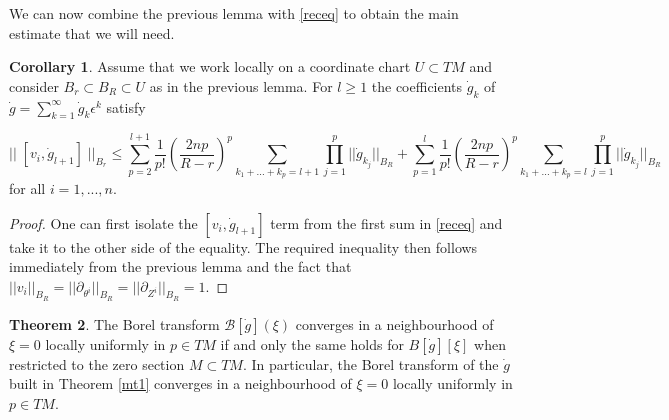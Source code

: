 \documentclass{article}
\theoremstyle{definition}
\newtheorem{theorem}{Theorem}[section]
\newtheorem{corollary}[theorem]{Corollary}
\numberwithin{equation}{section}
\begin{document}
We can now combine the previous lemma with \eqref{receq} to obtain the main estimate that we will need.
\begin{corollary}\label{keycol} Assume that we work locally on a coordinate chart $U\subset TM$ and consider $B_r\subset B_R\subset U$ as in the previous lemma. For $l\geq 1$ the coefficients $\dot{g}_{k}$ of $\dot{g}=\sum_{k=1}^{\infty}\dot{g}_k\epsilon^k$ satisfy

\begin{equation*}
    ||\;[v_i,\dot{g}_{l+1}]\;||_{B_r} \leq \sum_{p=2}^{l+1}\frac{1}{p!}\left(\frac{2np}{R-r}\right)^p\sum_{k_1+...+k_p=l+1}\prod_{j=1}^{p}||\dot{g}_{k_j}||_{B_R}+\sum_{p=1}^{l}\frac{1}{p!}\left(\frac{2np}{R-r}\right)^p\sum_{k_1+...+k_p=l}\prod_{j=1}^{p}||\dot{g}_{k_j}||_{B_R}
\end{equation*}
for all $i=1,...,n$.
\end{corollary}
\begin{proof}
    One can first isolate the $[v_i,\dot{g}_{l+1}]$ term from the first sum in \eqref{receq} and take it to the other side of the equality. The required inequality then follows immediately from the previous lemma and the fact that $||v_i||_{B_R}=||\partial_{\theta^i}||_{B_R}=||\partial_{Z^i}||_{B_R}=1$.
\end{proof}

\begin{theorem}\label{mt2}
The Borel transform $\mathcal{B}[\dot{g}](\xi)$ converges in a neighbourhood of $\xi=0$ locally uniformly in $p\in TM$ if and only the same holds for $B[\dot{g}][\xi]$ when restricted to the zero section $M\subset TM$. In particular, the Borel transform of the $\dot{g}$ built in Theorem \ref{mt1} converges in a neighbourhood of $\xi=0$ locally uniformly in $p\in TM$.
\end{theorem}
\end{document}
